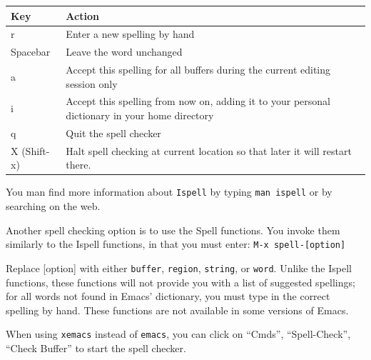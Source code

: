 \documentclass[bachelor,       %
               twoside,        %
               BCOR10mm,       %
               ngerman,english  %
               ]{GAUBM}
\begin{document}
\begin{table}[h]
\begin{tabular}{lp{12cm}}
Key         & Action\\ \hline
r           & Enter a new spelling by hand \\
Spacebar    & Leave the word unchanged\\
a           & Accept this spelling for all buffers during the current
              editing session only\\
i           & Accept this spelling from now on, adding it to your personal
              dictionary in your home directory\\
q           & Quit the spell checker\\
X (Shift-x) & Halt spell checking at current location so that
              later it will restart there.\\ \hline
\end{tabular}
\end{table}

You man find more information about {\tt Ispell} by typing {\tt man
  ispell} or by searching on the web.

Another spell checking option is to use the Spell functions. You
invoke them similarly to the Ispell functions, in that you must enter:
{\tt M-x spell-[option]}

Replace [option] with either {\tt buffer}, {\tt region}, {\tt string},
or {\tt word}.  Unlike the Ispell functions, these functions will not
provide you with a list of suggested spellings; for all words not
found in Emacs' dictionary, you must type in the correct spelling by
hand. These functions are not available in some versions of Emacs.

When using {\tt xemacs} instead of {\tt emacs}, you can click on ``Cmds'',
``Spell-Check'', ``Check Buffer'' to start the spell checker.
\end{document}

